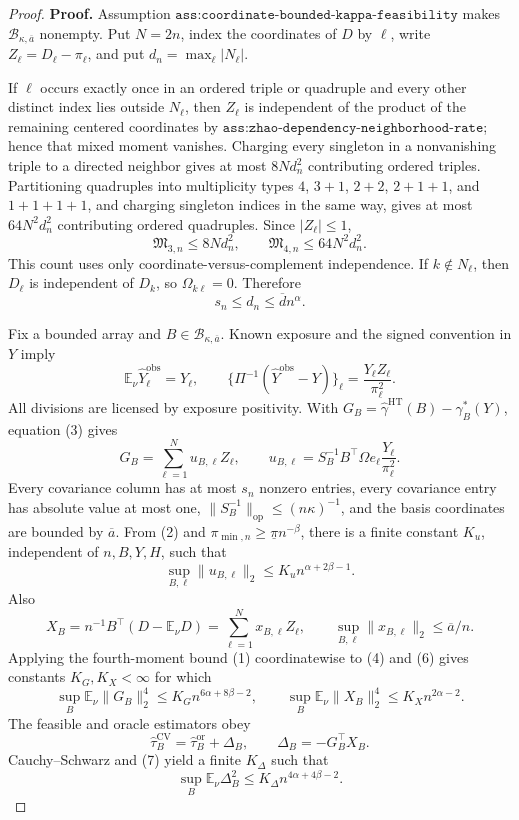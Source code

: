 \documentclass{article}
\begin{document}
\begin{proof}
\textbf{Proof.}
Assumption \(\texttt{ass:coordinate-bounded-kappa-feasibility}\) makes \(\mathcal B_{\kappa,\overline a}\) nonempty.  Put \(N=2n\), index the coordinates of \(D\) by \(\ell\), write \(Z_\ell=D_\ell-\pi_\ell\), and put \(d_n=\max_\ell|N_\ell|\).

If \(\ell\) occurs exactly once in an ordered triple or quadruple and every other distinct index lies outside \(N_\ell\), then \(Z_\ell\) is independent of the product of the remaining centered coordinates by \(\texttt{ass:zhao-dependency-neighborhood-rate}\); hence that mixed moment vanishes.  Charging every singleton in a nonvanishing triple to a directed neighbor gives at most \(8Nd_n^2\) contributing ordered triples.  Partitioning quadruples into multiplicity types \(4\), \(3+1\), \(2+2\), \(2+1+1\), and \(1+1+1+1\), and charging singleton indices in the same way, gives at most \(64N^2d_n^2\) contributing ordered quadruples.  Since \(|Z_\ell|\le1\),
\[
\mathfrak M_{3,n}\le8Nd_n^2,
\qquad
\mathfrak M_{4,n}\le64N^2d_n^2.
\tag{1}
\]
This count uses only coordinate-versus-complement independence.  If \(k\notin N_\ell\), then \(D_\ell\) is independent of \(D_k\), so \(\Omega_{k\ell}=0\).  Therefore
\[
s_n\le d_n\le\overline d n^\alpha.
\tag{2}
\]

Fix a bounded array and \(B\in\mathcal B_{\kappa,\overline a}\).  Known exposure and the signed convention in \(Y\) imply
\[
\mathbb E_\nu\widehat Y_\ell^{\mathrm{obs}}=Y_\ell,
\qquad
\{\Pi^{-1}(\widehat Y^{\mathrm{obs}}-Y)\}_\ell
=\frac{Y_\ell Z_\ell}{\pi_\ell^2}.
\tag{3}
\]
All divisions are licensed by exposure positivity.  With \(G_B=\widehat\gamma^{\mathrm{HT}}(B)-\gamma_B^*(Y)\), equation (3) gives
\[
G_B=\sum_{\ell=1}^Nu_{B,\ell}Z_\ell,
\qquad
u_{B,\ell}=S_B^{-1}B^{\top}\Omega e_\ell\frac{Y_\ell}{\pi_\ell^2}.
\tag{4}
\]
Every covariance column has at most \(s_n\) nonzero entries, every covariance entry has absolute value at most one, \(\lVert S_B^{-1}\rVert_{\mathrm{op}}\le(n\kappa)^{-1}\), and the basis coordinates are bounded by \(\overline a\).  From (2) and \(\pi_{\min,n}\ge\underline\pi n^{-\beta}\), there is a finite constant \(K_u\), independent of \(n,B,Y,H\), such that
\[
\sup_{B,\ell}\lVert u_{B,\ell}\rVert_2
\le K_un^{\alpha+2\beta-1}.
\tag{5}
\]
Also
\[
X_B=n^{-1}B^{\top}(D-\mathbb E_\nu D)
=\sum_{\ell=1}^Nx_{B,\ell}Z_\ell,
\qquad
\sup_{B,\ell}\lVert x_{B,\ell}\rVert_2\le\overline a/n.
\tag{6}
\]
Applying the fourth-moment bound (1) coordinatewise to (4) and (6) gives constants \(K_G,K_X<\infty\) for which
\[
\sup_B\mathbb E_\nu\lVert G_B\rVert_2^4
\le K_Gn^{6\alpha+8\beta-2},
\qquad
\sup_B\mathbb E_\nu\lVert X_B\rVert_2^4
\le K_Xn^{2\alpha-2}.
\tag{7}
\]
The feasible and oracle estimators obey
\[
\widehat\tau_B^{\mathrm{CV}}=\widehat\tau_B^{\mathrm{or}}+\Delta_B,
\qquad \Delta_B=-G_B^{\top}X_B.
\tag{8}
\]
Cauchy--Schwarz and (7) yield a finite \(K_\Delta\) such that
\[
\sup_B\mathbb E_\nu\Delta_B^2
\le K_\Delta n^{4\alpha+4\beta-2}.
\tag{9}
\]


\end{proof}
\end{document}
